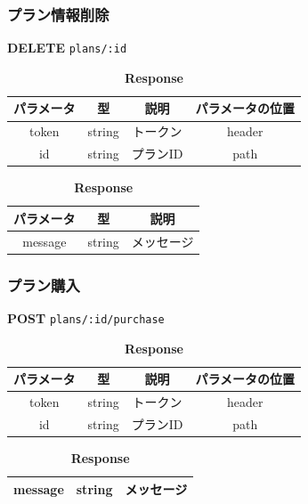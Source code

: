 \subsubsection*{プラン情報削除}
\textbf{DELETE} \texttt{plans/:id}
\begin{table}[H]
  \begin{minipage}
    {0.5\hsize} \centering \captionsetup{labelformat=empty,labelsep=none} \caption{\textbf{Request}}
    \begin{tabular}{|c|c|c|c|} \hline
      パラメータ & 型      & 説明    & パラメータの位置 \\ \hline \hline
      token & string & トークン  & header   \\ \hline
      id    & string & プランID & path     \\ \hline
    \end{tabular}
  \end{minipage}
  \begin{minipage}
    {0.5\hsize} \centering \captionsetup{labelformat=empty,labelsep=none} \caption{\textbf{Response}}
    \begin{tabular}{|c|c|c|} \hline
      パラメータ   & 型      & 説明    \\ \hline \hline
      message & string & メッセージ \\ \hline
    \end{tabular}
  \end{minipage}
\end{table}

\subsubsection*{プラン購入}
\textbf{POST} \texttt{plans/:id/purchase}
\begin{table}[H]
  \begin{minipage}
    {0.5\hsize}
    \centering
    \captionsetup{labelformat=empty,labelsep=none} \caption{\textbf{Request}}
    \begin{tabular}{|c|c|c|c|} \hline
      パラメータ & 型      & 説明    & パラメータの位置 \\ \hline \hline
      token & string & トークン  & header   \\ \hline
      id    & string & プランID & path     \\ \hline
    \end{tabular}
  \end{minipage}
  \begin{minipage}
    {0.5\hsize} \centering \captionsetup{labelformat=empty,labelsep=none} \caption{\textbf{Response}}
    \begin{tabular}{|c|c|c|} \hline
      message & string & メッセージ \\ \hline
    \end{tabular}
  \end{minipage}
\end{table}
\hrulefill
